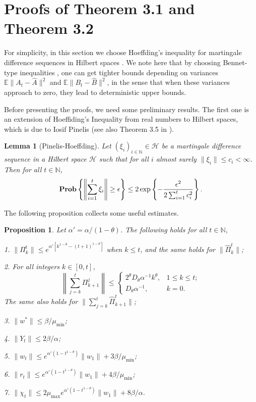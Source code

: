 \documentclass[twoside,twocolumn,journal]{IEEEtran}
\newtheorem{lem}[thm]{Lemma}
\newtheorem{prop}[thm]{Proposition}
\def\N{{\mathbb N}}
\def\E{{\mathbb E}}        %
\def\H{{\mathscr H}}
\def\Prob{{\bf Prob}}
\def\amax{{\mu_{\max}}}
\def\amin{{\mu_{\min}} }
\begin{document}
\section{Proofs of Theorem 3.1 and Theorem 3.2}

For simplicity, in this section we choose Hoeffding's inequality for martingale difference sequences in
Hilbert spaces \cite{Pinelis92}. We note here that by choosing Bennet-type inequalities \cite{Pinelis94},
one can get tighter bounds depending on variances $\E\|A_t - \hat{A}\|^2$ and $\E\|B_t-\hat{B}\|^2$, in the sense that when these
variances approach to zero, they lead to deterministic upper bounds.

Before presenting the proofs, we need some preliminary results. The first one is an extension of Hoeffiding's Inequality from real numbers to
Hilbert spaces, which is due to Iosif Pinelis \cite{Pinelis92} (see also Theorem 3.5 in \cite{Pinelis94}).

\medskip

\begin{lem}[Pinelis-Hoeffding] \label{lem:pinelis}
Let $(\xi_i)_{i\in \N}\in \H$ be a martingale difference sequence in a Hilbert space $\H$ such that for all $i$ almost surely
$\|\xi_i\|\leq c_i<\infty$. Then for all $t\in \N$,
\[ \Prob \left\{ \left\|\sum_{i=1}^t \xi_i \right\| \geq \epsilon \right\} \leq
2 \exp \left\{-\frac{\epsilon^2}{2\sum_{i=1}^t c_i^2} \right\}. \]
\end{lem}

\medskip

The following proposition collects some useful estimates.

\medskip

\begin{prop} \label{prop:bounds} Let $\alpha'=\alpha/(1-\theta)$. The following holds for all $t\in \N$,

1. $\|\Pi_k^t \| \leq e^{\alpha'[k^{1-\theta} - (t+1)^{1-\theta}]}$ when $k\leq t$, and the same holds for $\|\hat{\Pi}_k^t\|$;

2. For all integers $k\in [0,t]$,
\[
\left\|\sum_{j=k}^t \Pi_{k+1}^j \right\| \leq \left\{
\begin{array}{lr}
2^\theta D_\theta \alpha^{-1} k^\theta, & 1\leq k \leq t; \\
D_\theta \alpha^{-1}, & k=0.
\end{array}
\right.
\]
The same also holds for $\|\sum_{j=k}^t\hat{\Pi}_{k+1}^t\|$;

3. $\| w^\ast  \| \leq \beta/\amin$;

4. $\|Y_t \| \leq 2 \beta/\alpha$;

5. $\|w_t\| \leq  e^{\alpha'(1-t^{1-\theta})} \|w_1\|+ 3\beta/\amin$;

6. $\|r_t\| \leq  e^{\alpha'(1-t^{1-\theta})} \|w_1\|+ 4\beta/\amin$;

7. $\| \chi_t\| \leq  2\amax e^{\alpha'(1-t^{1-\theta})} \|w_1\| + 8\beta/\alpha$.
\end{prop}
\end{document}
